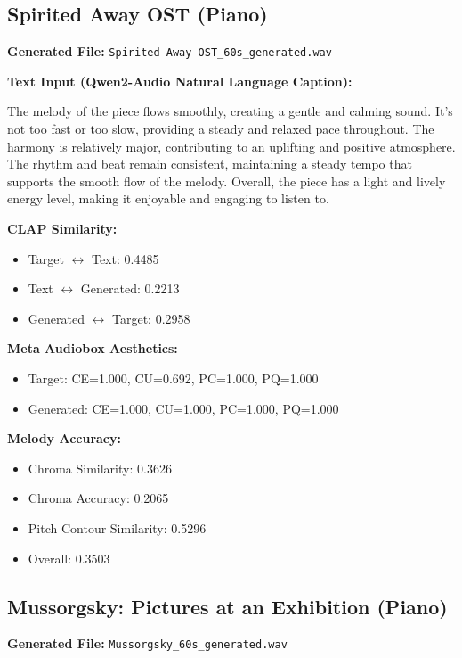 \documentclass{article}
\begin{document}
\begin{CJK}{UTF8}{bsmi}
\subsection{Spirited Away OST (Piano)}

\textbf{Generated File:} \texttt{Spirited Away OST\_60s\_generated.wav}

\textbf{Text Input (Qwen2-Audio Natural Language Caption):}

\small
The melody of the piece flows smoothly, creating a gentle and calming sound. It's not too fast or too slow, providing a steady and relaxed pace throughout. The harmony is relatively major, contributing to an uplifting and positive atmosphere. The rhythm and beat remain consistent, maintaining a steady tempo that supports the smooth flow of the melody. Overall, the piece has a light and lively energy level, making it enjoyable and engaging to listen to.
\normalsize

\textbf{CLAP Similarity:}
\begin{itemize}
    \item Target $\leftrightarrow$ Text: 0.4485
    \item Text $\leftrightarrow$ Generated: 0.2213
    \item Generated $\leftrightarrow$ Target: 0.2958
\end{itemize}

\textbf{Meta Audiobox Aesthetics:}
\begin{itemize}
    \item Target: CE=1.000, CU=0.692, PC=1.000, PQ=1.000
    \item Generated: CE=1.000, CU=1.000, PC=1.000, PQ=1.000
\end{itemize}

\textbf{Melody Accuracy:}
\begin{itemize}
    \item Chroma Similarity: 0.3626
    \item Chroma Accuracy: 0.2065
    \item Pitch Contour Similarity: 0.5296
    \item Overall: 0.3503
\end{itemize}

\subsection{Mussorgsky: Pictures at an Exhibition (Piano)}

\textbf{Generated File:} \texttt{Mussorgsky\_60s\_generated.wav}


\end{CJK}
\end{document}
